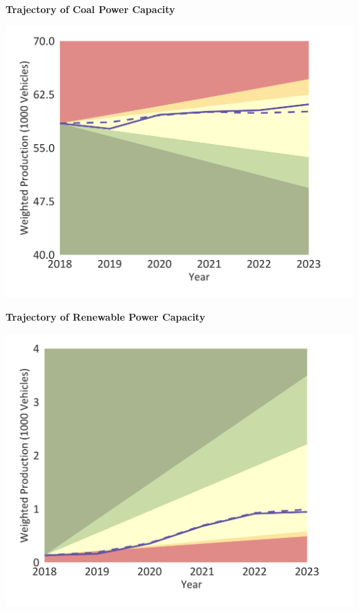 \documentclass[10pt,table,a4]{article}\usepackage[]{graphicx}\usepackage[]{color}
\begin{document}
	\begin{minipage}[t]{.49\linewidth}
		\textbf{Trajectory of Coal Power Capacity }
		
		\includegraphics[trim = {0 0cm 0 0},width=1\linewidth]{CAFigures/Fig14}
		
		\textbf{Trajectory of Renewable Power Capacity }
		
		\includegraphics[trim = {0 0cm 0 0},width=.99\linewidth]{CAFigures/Fig15}
	\end{minipage}	
	\hspace{.02\linewidth}
\end{document}
